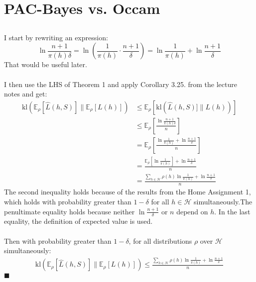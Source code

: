 \documentclass[a4paper]{article}
\newcommand*{\QEDA}{\hfill\ensuremath{\blacksquare}}%
\begin{document}
\section{PAC-Bayes vs. Occam}
\label{sec:3}
\subsection{}
\label{subsec:31}
I start by rewriting an expression:
\[
\ln \frac{n+1}{\pi(h) \delta} 
=\ln{\left(\frac{1}{\pi(h)} \cdot \frac{n+1}{\delta}\right)}
=\ln{\frac{1}{\pi(h)}} + \ln{\frac{n+1}{\delta}}
\]
That would be useful later. \\\\
I then use the LHS of Theorem 1 and apply Corollary 3.25. from the
lecture notes and get:
\begin{align*}
\mathrm{kl}\left(\mathbb{E}_{\rho}[\hat{L}(h, S)] \|
\mathbb{E}_{\rho}[L(h)]\right) &\leq
\mathbb{E}_{\rho}[\mathrm{kl}(\hat{L}(h, S)] \| L(h))]\\
&\leq \mathbb{E}_{\rho}\left[\frac{\ln \frac{n+1}{\pi(h) \delta}}{n}\right]\\
&= \mathbb{E}_{\rho}\left[\frac{\ln{\frac{1}{\pi(h)}} + \ln{\frac{n+1}{\delta}}}{n}\right] \\
&= \frac{\mathbb{E}_{\rho}\left[\ln{\frac{1}{\pi(h)}}\right] + \ln{\frac{n+1}{\delta}}}{n} \\
&= \frac{\sum_{h \in \mathcal{H}}\rho(h)\ln{\frac{1}{\pi(h)}} + \ln{\frac{n+1}{\delta}}}{n}
\end{align*}
The second inequality holds because of the results from the Home Assignment 1,
which holds with probability greater than $1-\delta$ for all $h \in \mathcal{H}$
simultaneously.The penultimate equality holds because neither $\ln{\frac{n+1}{\delta}}$ or $n$
depend on $h$. In the last equality, the definition of expected value is used.\\\\
Then with probability greater than $1-\delta$, for all distributions $\rho$
over $\mathcal{H}$ simultaneously:
\begin{align}
  \label{T1}
  \mathrm{kl}\left(\mathbb{E}_{\rho}[\hat{L}(h, S)] \|
  \mathbb{E}_{\rho}[L(h)]\right) \leq
  \frac{\sum_{h \in \mathcal{H}} \rho(h) \ln \frac{1}{\pi(h)}+\ln \frac{n+1}{\delta}}{n}
\end{align}
\QEDA
\end{document}
